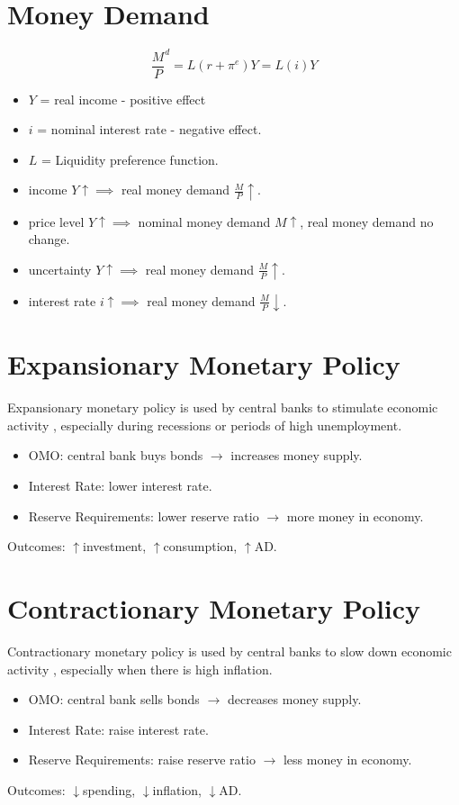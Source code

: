 \documentclass[a4paper, 11pt]{article}
\begin{document}
\section{Money Demand}
\[
\frac{M}{P}^d = L(r+\pi^e) Y = L(i)Y
\]
\begin{itemize}
    \item $Y$ = real income - positive effect
    \item $i$ = nominal interest rate - negative effect.
    \item $L$ = Liquidity preference function.
\end{itemize}

\begin{itemize}
    \item income $Y \uparrow \implies$ real money demand $\frac{M}{P}\uparrow$.
    \item price level $Y \uparrow \implies$ nominal money demand $M \uparrow$, real money demand no change.
    \item uncertainty $Y \uparrow \implies$ real money demand $\frac{M}{P}\uparrow$.
    \item interest rate $i \uparrow \implies$ real money demand $\frac{M}{P}\downarrow$.
\end{itemize}

\section{Expansionary Monetary Policy}
Expansionary monetary policy is used by central banks to stimulate economic activity , especially during recessions or periods of high unemployment.
\begin{itemize}
    \item OMO: central bank buys bonds $\rightarrow$ increases money supply.
    \item Interest Rate: lower interest rate.
    \item Reserve Requirements: lower reserve ratio $\rightarrow$ more money in economy.
\end{itemize}
Outcomes: $\uparrow$investment, $\uparrow$consumption, $\uparrow$AD.

\section{Contractionary Monetary Policy}
Contractionary monetary policy is used by central banks to slow down economic activity , especially when there is high inflation.
\begin{itemize}
    \item OMO: central bank sells bonds $\rightarrow$ decreases money supply.
    \item Interest Rate: raise interest rate.
    \item Reserve Requirements: raise reserve ratio $\rightarrow$ less money in economy.
\end{itemize}
Outcomes: $\downarrow$spending, $\downarrow$inflation, $\downarrow$AD.
\end{document}
